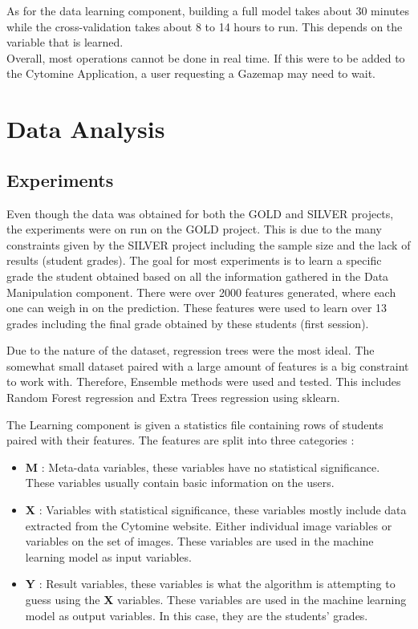 \documentclass[a4paper,11pt]{report}
\numberwithin{figure}{section} %
\begin{document}
    As for the data learning component, building a full model takes about 30 minutes while the cross-validation takes about 8 to 14 hours to run.
    This depends on the variable that is learned. \\

    Overall, most operations cannot be done in real time.
    If this were to be added to the Cytomine Application, a user requesting a Gazemap may need to wait.

\chapter{Data Analysis}

	\section{Experiments} \label{experiments}


    Even though the data was obtained for both the GOLD and SILVER projects, the experiments were on run on the GOLD project.
    This is due to the many constraints given by the SILVER project including the sample size and the lack of results (student grades).
    The goal for most experiments is to learn a specific grade the student obtained based on all the information gathered in the Data Manipulation component.
    There were over 2000 features generated, where each one can weigh in on the prediction.
    These features were used to learn over 13 grades including the final grade obtained by these students (first session).\newline


    Due to the nature of the dataset, regression trees were the most ideal.
    The somewhat small dataset paired with a large amount of features is a big constraint to work with.
    Therefore, Ensemble methods were used and tested.
    This includes Random Forest regression and Extra Trees regression using sklearn.\newline

    The Learning component is given a statistics file containing rows of students paired with their features.
    The features are split into three categories :
    \begin{itemize}
\item[\textbullet] \textbf{M} : Meta-data variables, these variables have no statistical significance.
These variables usually contain basic information on the users.\\
\item[\textbullet] \textbf{X} : Variables with statistical significance, these variables mostly include data extracted from the Cytomine website.
Either individual image variables or variables on the set of images.
These variables are used in the machine learning model as input variables.\\
\item[\textbullet] \textbf{Y} : Result variables, these variables is what the algorithm is attempting to guess using the  \textbf{X} variables.
These variables are used in the machine learning model as output variables. In this case, they are the students' grades.\\
\end{itemize}
\end{document}
